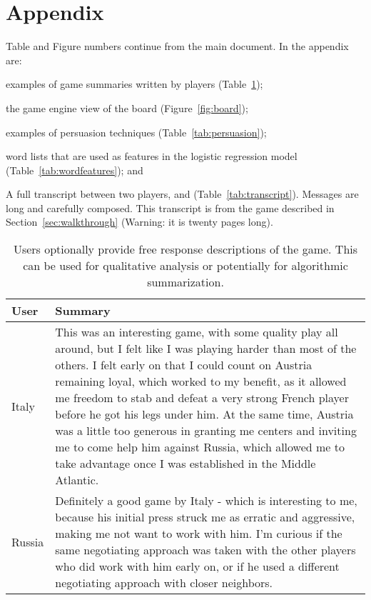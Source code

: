 \onecolumn
\appendix
\section{Appendix}
\label{appendix}

Table and Figure numbers continue from the main document.  In the appendix are:
\begin{enumerate*}
  \item examples of game summaries written by  players (Table~\ref{tab:userfeedback});
  
  \item the game engine view of the board (Figure~\ref{fig:board});
  
  \item examples of persuasion techniques (Table~\ref{tab:persuasion});
  
  \item \wordlist{} word lists that are used as features in the logistic regression model (Table~\ref{tab:wordfeatures}); and

 \item A full transcript between two players,  and
 (Table~\ref{tab:transcript}).  Messages are long and carefully composed. This transcript is from the game described in Section~\ref{sec:walkthrough} (Warning: it is twenty pages long).
\end{enumerate*}



\begin{table}[h!]
	\centering
	\begin{tabular}{p{1cm} p{13cm} }
		\bf User & \bf                     Summary \\
		\toprule
		\noalign{\vskip 2mm} 
		Italy &This was an interesting game, with some quality play all around, but I felt like I was playing harder than most of the others. I felt early on that I could count on Austria remaining loyal, which worked to my benefit, as it allowed me freedom to stab and defeat a very strong French player before he got his legs under him. At the same time, Austria was a little too generous in granting me centers and inviting me to come help him against Russia, which allowed me to take advantage once I was established in the Middle Atlantic. \\
		\hline
		\noalign{\vskip 2mm} 
		Russia &Definitely a good game by Italy - which is interesting to me, because his initial press struck me as erratic and aggressive, making me not want to work with him. I'm curious if the same negotiating approach was taken with the other players who did work with him early on, or if he used a different negotiating approach with closer neighbors.\\
		\bottomrule
	\end{tabular}
	\caption{Users optionally provide free response descriptions of the game.  This can be used for qualitative analysis or potentially for algorithmic summarization.}
	\label{tab:userfeedback}
\end{table}


